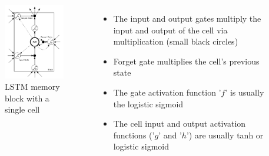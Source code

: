 \documentclass{beamer}
\begin{document}
{
	\begin{columns}
		\begin{figure}[ht]  
			\begin{center}
				\includegraphics[width=1.8in]{Images/LSTM_detail.png}   
			\end{center}   
			\caption{\centering LSTM memory block with a single cell}
		\end{figure}
		\begin{itemize}
			\item The input and output gates multiply the input and output of the cell via multiplication (small black circles)
			\item Forget gate multiplies the cell's previous state
			\item The gate activation function '${ f }$' is usually the logistic sigmoid
			\item The cell input and output activation functions ('${ g }$' and '${ h }$') are usually tanh or logistic sigmoid
		\end{itemize}
	\end{columns}
}
\frame
\end{document}
